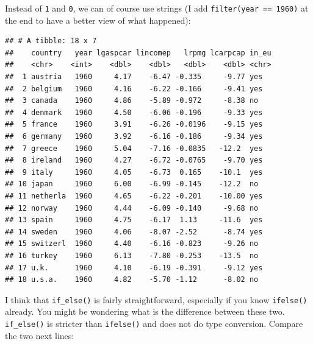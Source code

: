 \documentclass[]{gitbook}
\newenvironment{Shaded}{\begin{snugshade}}{\end{snugshade}}
\newcommand{\DataTypeTok}[1]{\textcolor[rgb]{0.13,0.29,0.53}{#1}}
\newcommand{\DecValTok}[1]{\textcolor[rgb]{0.00,0.00,0.81}{#1}}
\newcommand{\KeywordTok}[1]{\textcolor[rgb]{0.13,0.29,0.53}{\textbf{#1}}}
\newcommand{\NormalTok}[1]{#1}
\newcommand{\OperatorTok}[1]{\textcolor[rgb]{0.81,0.36,0.00}{\textbf{#1}}}
\newcommand{\StringTok}[1]{\textcolor[rgb]{0.31,0.60,0.02}{#1}}
\theoremstyle{definition}
\theoremstyle{definition}
\theoremstyle{definition}
\theoremstyle{remark}
\begin{document}
Instead of \texttt{1} and \texttt{0}, we can of course use strings (I
add \texttt{filter(year\ ==\ 1960)} at the end to have a better view of
what happened):

\begin{Shaded}
\end{Shaded}

\begin{verbatim}
## # A tibble: 18 x 7
##    country   year lgaspcar lincomep   lrpmg lcarpcap in_eu
##    <chr>    <int>    <dbl>    <dbl>   <dbl>    <dbl> <chr>
##  1 austria   1960     4.17    -6.47 -0.335     -9.77 yes  
##  2 belgium   1960     4.16    -6.22 -0.166     -9.41 yes  
##  3 canada    1960     4.86    -5.89 -0.972     -8.38 no   
##  4 denmark   1960     4.50    -6.06 -0.196     -9.33 yes  
##  5 france    1960     3.91    -6.26 -0.0196    -9.15 yes  
##  6 germany   1960     3.92    -6.16 -0.186     -9.34 yes  
##  7 greece    1960     5.04    -7.16 -0.0835   -12.2  yes  
##  8 ireland   1960     4.27    -6.72 -0.0765    -9.70 yes  
##  9 italy     1960     4.05    -6.73  0.165    -10.1  yes  
## 10 japan     1960     6.00    -6.99 -0.145    -12.2  no   
## 11 netherla  1960     4.65    -6.22 -0.201    -10.00 yes  
## 12 norway    1960     4.44    -6.09 -0.140     -9.68 no   
## 13 spain     1960     4.75    -6.17  1.13     -11.6  yes  
## 14 sweden    1960     4.06    -8.07 -2.52      -8.74 yes  
## 15 switzerl  1960     4.40    -6.16 -0.823     -9.26 no   
## 16 turkey    1960     6.13    -7.80 -0.253    -13.5  no   
## 17 u.k.      1960     4.10    -6.19 -0.391     -9.12 yes  
## 18 u.s.a.    1960     4.82    -5.70 -1.12      -8.02 no
\end{verbatim}

I think that \texttt{if\_else()} is fairly straightforward, especially
if you know \texttt{ifelse()} already. You might be wondering what is
the difference between these two. \texttt{if\_else()} is stricter than
\texttt{ifelse()} and does not do type conversion. Compare the two next
lines:
\end{document}
